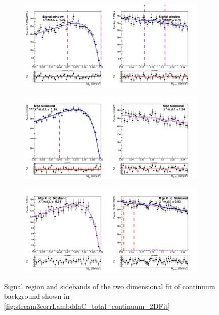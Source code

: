 \newpage


\begin{figure}[H]
  \begin{subfigure}{15cm}
    \centering\includegraphics[width=14cm]{A1-Appendix/figs/Signal_window_stream3_Continuum_charged_corrLambdaC_2Dfit.png}
  \end{subfigure}
  \begin{subfigure}{15cm}
    \centering\includegraphics[width=14cm]{A1-Appendix/figs/Mbc_Sideband_stream3_Continuum_charged_corrLambdaC_2Dfit.png}
  \end{subfigure}

  \begin{subfigure}{15cm}
    \centering\includegraphics[width=14cm]{A1-Appendix/figs/InvM_Sideband_stream3_Continuum_charged_corrLambdaC_2Dfit.png}
  \end{subfigure}
  \caption{Signal region and sidebands of the two dimensional fit of continuum background shown in \cref{fig:stream3corrLambddaC_total_continuum_2DFit}}
\end{figure}




